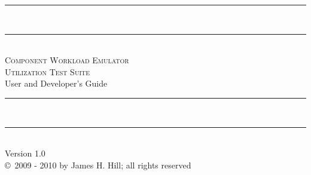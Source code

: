 
\newcommand{\hr}{\rule{\linewidth}{0.5mm}}

\begin{titlepage}
\begin{center}

\hr
\\
\hr
\\[0.1in]
\textsc{\Huge Component Workload Emulator\\Utilization Test Suite}
\\[0.25in]
{\huge User and Developer's Guide}
\\[0.1in]
\hr
\\
\hr
\\
\vfill
{\large Version 1.0}
\\
{\large \copyright\ 2009 - 2010 by James H. Hill; all rights reserved}
\end{center}
\end{titlepage}
